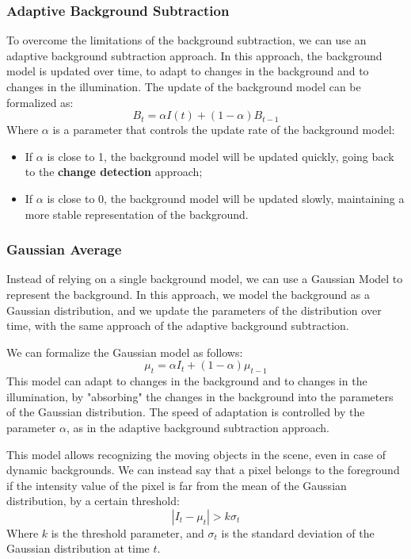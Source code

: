 \subsubsection{Adaptive Background Subtraction}
To overcome the limitations of the background subtraction, we can use an adaptive background subtraction approach.
In this approach, the background model is updated over time, to adapt to changes in the background and to changes in the illumination.
The update of the background model can be formalized as:
\begin{equation}
    B_t = \alpha I(t) + (1 - \alpha) B_{t-1}
\end{equation}
Where $\alpha$ is a parameter that controls the update rate of the background model:
\begin{itemize}
    \item If $\alpha$ is close to 1, the background model will be updated quickly, going back to the \textbf{change detection} approach;
    \item If $\alpha$ is close to 0, the background model will be updated slowly, maintaining a more stable representation of the background.
\end{itemize}

\subsubsection{Gaussian Average}
Instead of relying on a single background model, we can use a Gaussian Model to represent the background.
In this approach, we model the background as a Gaussian distribution, and we update the parameters of the distribution over time,
with the same approach of the adaptive background subtraction. 

We can formalize the Gaussian model as follows:
\begin{equation}
    \label{eq:gaussian_update}
    \mu_t = \alpha I_t + (1 - \alpha) \mu_{t-1}
\end{equation}
This model can adapt to changes in the background and to changes in the illumination,
by "absorbing" the changes in the background into the parameters of the Gaussian distribution.
The speed of adaptation is controlled by the parameter $\alpha$, as in the adaptive background subtraction approach.

This model allows recognizing the moving objects in the scene, even in case of dynamic backgrounds.
We can instead say that a pixel belongs to the foreground if the intensity value of the pixel is far from the mean of the Gaussian distribution, by a certain threshold:
\begin{equation}
    |I_t - \mu_t| > k \sigma_t
\end{equation}
Where $k$ is the threshold parameter, and $\sigma_t$ is the standard deviation of the Gaussian distribution at time $t$.

